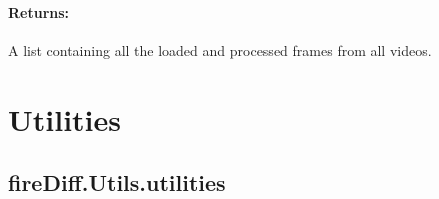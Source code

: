 \documentclass[a4paper,10pt,english]{sphinxmanual}
\begin{document}
\begin{fulllineitems}
\begin{fulllineitems}
\subsubsection{Returns:}
\label{\detokenize{datasets:id4}}\begin{description}
\sphinxAtStartPar
A list containing all the loaded and processed frames from all
videos.

\end{description}

\end{fulllineitems}


\end{fulllineitems}


\sphinxstepscope


\chapter{Utilities}
\label{\detokenize{utils:utilities}}\label{\detokenize{utils::doc}}

\section{fireDiff.Utils.utilities}
\label{\detokenize{utils:module-fireDiff.Utils.utilities}}\label{\detokenize{utils:firediff-utils-utilities}}
\end{document}
